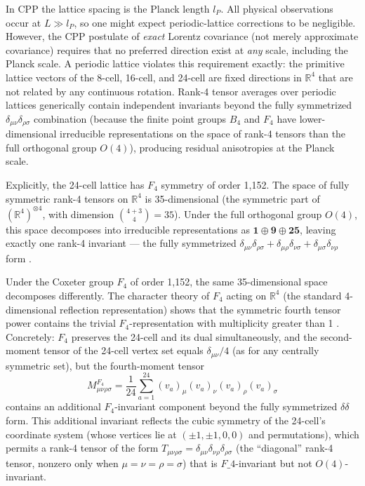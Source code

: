 \documentclass[11pt,letterpaper]{article}
\begin{document}
In CPP the lattice spacing is the Planck length $l_P$. All physical observations occur at $L \gg l_P$, so one might expect periodic-lattice corrections to be negligible. However, the CPP postulate of \emph{exact} Lorentz covariance (not merely approximate covariance) requires that no preferred direction exist at \emph{any} scale, including the Planck scale. A periodic lattice violates this requirement exactly: 
the primitive lattice vectors of the 8-cell, 16-cell, and 24-cell are fixed directions in $\mathbb{R}^4$ that are not related by any continuous rotation. Rank-4 tensor averages over periodic lattices generically contain independent invariants beyond the fully symmetrized $\delta_{\mu\nu}\delta_{\rho\sigma}$ combination (because the finite point groups $B_4$ and $F_4$ have lower-dimensional irreducible representations on the space of rank-4 tensors than the full orthogonal group $O(4)$), producing residual anisotropies at the Planck scale.

Explicitly, the 24-cell lattice has $F_4$ symmetry of order 1,152. The space of fully symmetric rank-4 tensors on $\mathbb{R}^4$ is 
35-dimensional (the symmetric part of $(\mathbb{R}^4)^{\otimes 4}$, with dimension $\binom{4+3}{4} = 35$). Under the full orthogonal 
group $O(4)$, this space decomposes into irreducible representations as $\mathbf{1} \oplus \mathbf{9} \oplus \mathbf{25}$, leaving exactly 
one rank-4 invariant — the fully symmetrized $\delta_{\mu\nu}\delta_{\rho\sigma} + \delta_{\mu\rho}\delta_{\nu\sigma} + \delta_{\mu\sigma}\delta_{\nu\rho}$ form \cite{weyl1946}.

Under the Coxeter group $F_4$ of order 1,152, the same 35-dimensional space decomposes differently. The character theory of $F_4$ acting on 
$\mathbb{R}^4$ (the standard 4-dimensional reflection representation) shows that the symmetric fourth tensor power contains the trivial 
$F_4$-representation with multiplicity greater than 1 \cite{humphreys1990}. Concretely: $F_4$ preserves the 24-cell and 
its dual simultaneously, and the second-moment tensor of the 24-cell vertex set equals $\delta_{\mu\nu}/4$ (as for any centrally symmetric 
set), but the fourth-moment tensor 
\begin{equation}
M_{\mu\nu\rho\sigma}^{F_4} = \frac{1}{24}\sum_{a=1}^{24} 
(v_a)_\mu(v_a)_\nu(v_a)_\rho(v_a)_\sigma
\label{eq:F4_rank4}
\end{equation}
contains an additional $F_4$-invariant component beyond the fully symmetrized $\delta\delta$ form. This additional invariant reflects the cubic symmetry of the 24-cell's coordinate system (whose vertices lie at $(\pm 1, \pm 1, 0, 0)$ and permutations), which permits a rank-4 tensor of the form $T_{\mu\nu\rho\sigma} = \delta_{\mu\nu}\delta_{\nu\rho}\delta_{\rho\sigma}$ (the ``diagonal'' rank-4 tensor, nonzero only when $\mu = \nu = \rho = \sigma$) that is $F\_4$-invariant but not $O(4)$-invariant.
\end{document}
